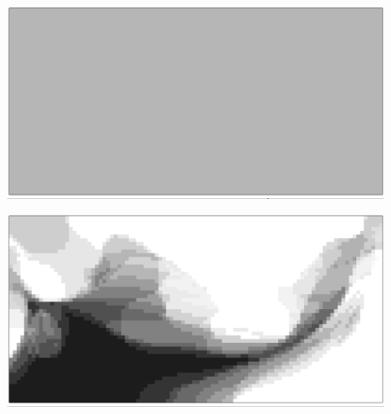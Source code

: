  \begin{subfigure}[t]{0.24\columnwidth} %
     \centering
		   \includegraphics[width=\textwidth]{images/chap5/Inverter_evo_00.png} %
 \end{subfigure}
 \hspace{0.2cm}
 \begin{subfigure}[t]{0.24\columnwidth} %
     \centering
		   \includegraphics[width=\textwidth]{images/chap5/Inverter_evo_02.png} %
 \end{subfigure}
